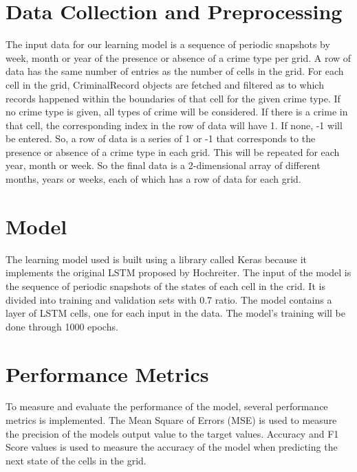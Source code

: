 \section{Data Collection and Preprocessing}
    The input data for our learning model is a sequence of periodic snapshots by week, month or year of the presence or absence of a crime type per grid. A row of data has the same number of entries as the number of cells in the grid. For each cell in the grid, CriminalRecord objects are fetched and filtered as to which records happened within the boundaries of that cell for the given crime type. If no crime type is given, all types of crime will be considered. If there is a crime in that cell, the corresponding index in the row of data will have 1. If none, -1 will be entered. So, a row of data is a series of 1 or -1 that corresponds to the presence or absence of a crime type in each grid. This will be repeated for each year, month or week. So the final data is a 2-dimensional array of different months, years or weeks, each of which has a row of data for each grid.

\section{Model}
    The learning model used is built using a library called Keras because it implements the original LSTM proposed by Hochreiter. The input of the model is the sequence of periodic snapshots of the states of each cell in the crid. It is divided into training and validation sets with 0.7 ratio. The model contains a layer of LSTM cells, one for each input in the data. The model's training will be done through 1000 epochs.

\section{Performance Metrics}
    To measure and evaluate the performance of the model, several performance metrics is implemented. The Mean Square of Errors (MSE) is used to measure the precision of the models output value to the target values. Accuracy and F1 Score values is used to measure the accuracy of the model when predicting the next state of the cells in the grid.
